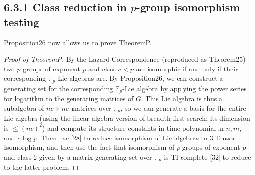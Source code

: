 \subsection*{6.3.1 Class reduction in $p$-group isomorphism testing}
Proposition26 now allows us to prove TheoremP.
\begin{proof}[Proof of TheoremP]
By the Lazard Correspondence (reproduced as Theorem25) two $p$-groups of exponent $p$ and class $c<p$ are isomorphic if and only if their corresponding $\mathbb F_p$-Lie algebras are. By Proposition26, we can construct a generating set for the corresponding $\mathbb F_p$-Lie algebra by applying the power series for logarithm to the generating matrices of $G$. This Lie algebra is thus a subalgebra of $ne\times ne$ matrices over $\mathbb F_p$, so we can generate a basis for the entire Lie algebra (using the linear-algebra version of breadth-first search; its dimension is $\le(ne)^2$) and compute its structure constants in time polynomial in $n,m$, and $e\log p$. Then use [28] to reduce isomorphism of Lie algebras to 3-Tensor Isomorphism, and then use the fact that isomorphism of $p$-groups of exponent $p$ and class 2 given by a matrix generating set over $\mathbb F_p$ is TI-complete [32] to reduce to the latter problem.
\end{proof}
